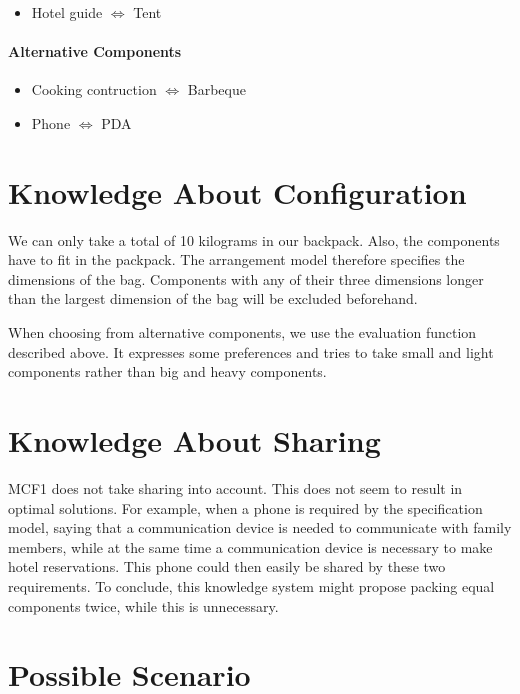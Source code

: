 \documentclass[a4paper,11pt]{article}
\begin{document}
\begin{itemize}
\item Hotel guide $\Leftrightarrow$ Tent
\end{itemize}

\paragraph{Alternative Components}

\begin{itemize}
\item Cooking contruction $\Leftrightarrow$ Barbeque
\item Phone $\Leftrightarrow$ PDA
\end{itemize}


\section{Knowledge About Configuration}

We can only take a total of 10 kilograms in our backpack.
Also, the components have to fit in the packpack.
The arrangement model therefore specifies the dimensions of the bag. 
Components with any of their three dimensions longer than the largest dimension 
of the bag will be excluded beforehand.

When choosing from alternative components, we use the evaluation function
described above. It expresses some preferences and tries to take small and light
components rather than big and heavy components.


\section{Knowledge About Sharing}

MCF1 does not take sharing into account. This does not seem to result in optimal 
solutions. For example, when a phone is required by the specification model, 
saying that a communication device is needed to communicate with family members, 
while at the same time a communication device is necessary to make hotel 
reservations. This phone could then easily be shared by these two requirements. 
To conclude, this knowledge system might propose packing equal components twice, 
while this is unnecessary.


\section{Possible Scenario}
\end{document}
